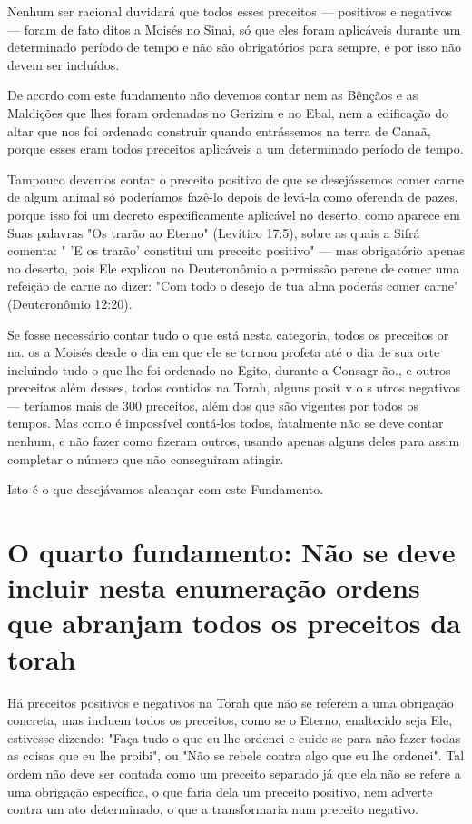\begin{itemize}
\begin{enumrate}
Nenhum ser racional duvidará que todos esses preceitos --- positi­vos e
negativos --- foram de fato ditos a Moisés no Sinai, só que eles foram
apli­cáveis durante um determinado período de tempo e não são
obrigatórios para sempre, e por isso não devem ser incluídos.

De acordo com este fundamento não devemos contar nem as Bênçãos 
e as Maldições que lhes foram ordenadas no Gerizim e no Ebal, nem a
edi­ficação do altar que nos foi ordenado construir quando entrássemos
na terra de Canaã, porque esses eram todos preceitos aplicáveis a um
determinado pe­ríodo de tempo.

Tampouco devemos contar o preceito positivo de que se desejásse­mos
comer carne de algum animal só poderíamos fazê-lo depois de levá-la
co­mo oferenda de pazes, porque isso foi um decreto especificamente
aplicável no deserto, como aparece em Suas palavras "Os trarão ao
Eterno" (Levítico 17:5), sobre as quais a Sifrá comenta: " 'E os trarão'
constitui um preceito positivo" --- mas obrigatório apenas no deserto,
pois Ele explicou no Deuteronômio a permissão perene de comer uma
refeição de carne ao dizer: "Com todo o dese­jo de tua alma poderás
comer carne" (Deuteronômio 12:20).

Se fosse necessário contar tudo o que está nesta categoria, todos os
preceitos or na. os a Moisés desde o dia em que ele se tornou profeta
até o dia de sua orte incluindo tudo o que lhe foi ordenado no Egito,
durante a Consagr ão., e outros preceitos além desses,
todos contidos na Torah, al­guns posit v o s utros negativos ---
teríamos mais de 300 preceitos, além dos que são vigentes por todos os
tempos. Mas como é impossível contá-los todos, fatalmente não se deve
contar nenhum, e não fazer como fizeram outros, usan­do apenas alguns
deles para assim completar o número que não conseguiram atingir.

Isto é o que desejávamos alcançar com este Fundamento.

\chapter{O quarto fundamento:
Não se deve incluir nesta enumeração ordens que abranjam todos os
preceitos da torah}

Há preceitos positivos e negativos na Torah que não se referem a uma
obrigação concreta, mas incluem todos os preceitos, como se o Eterno,
enaltecido seja Ele, estivesse dizendo: "Faça tudo o que eu lhe ordenei
e cuide-se para não fazer todas as coisas que eu lhe proibi", ou "Não se
rebele contra algo que eu lhe ordenei". Tal ordem não deve ser contada
como um preceito separado já que ela não se refere a uma obrigação
específica, o que faria dela um preceito positivo, nem adverte contra um
ato determinado, o que a trans­formaria num preceito negativo.


\end{enumrate}
\end{itemize}
